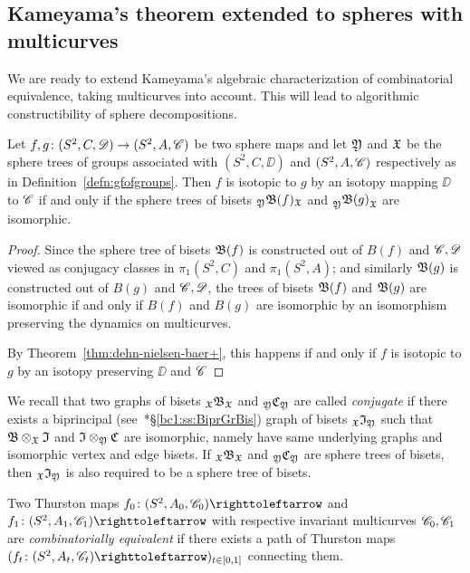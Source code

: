 \documentclass{amsart}
\begin{document}
\subsection{Kameyama's theorem extended to spheres with multicurves}
We are ready to extend Kameyama's algebraic characterization of
combinatorial equivalence, taking multicurves into account. This will
lead to algorithmic constructibility of sphere decompositions.

\begin{thm}\label{thm:kameyama-mc}
  Let $f,g\colon(S^2,C,{\mathscr D})\to(S^2,A,{\mathscr C})$ be two sphere maps and let
  ${\mathfrak Y}$ and ${\mathfrak X}$ be the sphere trees of groups associated with
  $(S^2,C,\DD)$ and $(S^2,A,{\mathscr C})$ respectively as in
  Definition~\ref{defn:gfofgroups}. Then $f$ is isotopic to $g$ by an
  isotopy mapping $\DD$ to ${\mathscr C}$ if and only if the sphere trees of
  bisets $\subscript\gfY\gfB(f)_\gf$ and
  $\subscript{\gfY}{\gfB(g)}_\gf$ are isomorphic.
\end{thm}
\begin{proof}
  Since the sphere tree of bisets ${\mathfrak B}(f)$ is constructed out of
  $B(f)$ and ${\mathscr C},{\mathscr D}$ viewed as conjugacy classes in $\pi_1(S^2,C)$
  and $\pi_1(S^2,A)$; and similarly ${\mathfrak B}(g)$ is constructed
  out of $B(g)$ and ${\mathscr C},{\mathscr D}$, the trees of bisets ${\mathfrak B}(f)$
  and ${\mathfrak B}(g)$ are isomorphic if and only if $B(f)$ and $B(g)$
  are isomorphic by an isomorphism preserving the dynamics on
  multicurves.

  By Theorem~\ref{thm:dehn-nielsen-baer+}, this happens if and only if
  $f$ is isotopic to $g$ by an isotopy preserving $\DD$ and ${\mathscr C}$
\end{proof}

We recall that two graphs of bisets $\subscript\gf\gfB_\gf$ and
$\subscript\gfY\gfC_\gfY$ are called \emph{conjugate} if there exists
a biprincipal
(see~\cite{bartholdi-dudko:bc1}*{\S\ref{bc1:ss:BiprGrBis}}) graph of
bisets $\subscript\gf\gfI_\gfY$ such that ${\mathfrak B}\otimes_{\mathfrak X}{\mathfrak I}$ and
${\mathfrak I}\otimes_{\mathfrak Y}{\mathfrak C}$ are isomorphic, namely have same underlying
graphs and isomorphic vertex and edge bisets. If
$\subscript\gf\gfB_\gf$ and $\subscript\gfY\gfC_\gfY$ are sphere trees
of bisets, then $\subscript\gf\gfI_\gfY$ is also required to be a
sphere tree of bisets.

Two Thurston maps $f_0\colon(S^2,A_0,\CC_0)\selfmap$ and
$f_1\colon(S^2,A_1,\CC_1)\selfmap$ with respective invariant
multicurves ${\mathscr C}_0,{\mathscr C}_1$ are \emph{combinatorially equivalent} if
there exists a path of Thurston maps
$(f_t\colon(S^2,A_t,\CC_t)\selfmap)_{t\in[0,1]}$ connecting them.
\end{document}
